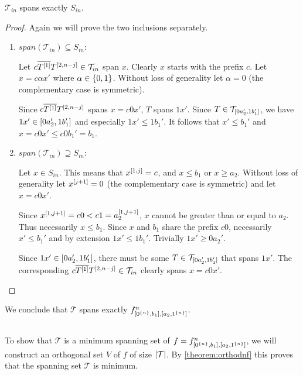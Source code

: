 \begin{lemma}
$\mathcal{T}_{in}$ spans exactly $S_{in}$.
\end{lemma}

\begin{proof}
Again
we will prove the two inclusions separately.
\begin{enumerate}
\item $span(\mathcal{T}_{in}) \subseteq S_{in}$:

Let $c \overline{T^{[1]}} T^{[2, n-j]} \in \mathcal{T}_{in}$ span $x$.
Clearly $x$ starts with the prefix $c$.
Let $x = c \alpha x'$ where $\alpha \in \{0, 1\}$.
Without loss of generality let $\alpha = 0$
(the complementary case is symmetric).

Since $c \overline{T^{[1]}} T^{[2, n-j]}$ spans
$x = c 0 x'$,
$T$ spans $1 x'$.
Since
$T \in \mathcal{T}_{[0 a_2', 1 b_1']}$,
we have $1 x' \in [0 a_2', 1 b_1']$
and especially $1 x' \leq 1 b_1'$.
It follows that $x' \leq b_1'$
and $x = c 0 x' \leq c 0 b_1' = b_1$.

\item $span(\mathcal{T}_{in}) \supseteq S_{in}$:

Let $x \in S_{in}$.
This means that $x^{[1, j]} = c$,
and $x \leq b_1$ or $x \geq a_2$.
Without loss of generality let $x^{[j+1]} = 0$
(the complementary case is symmetric)
and let $x = c 0 x'$.

Since $x^{[1, j+1]} = c 0 < c 1 = a_2^{[1, j+1]}$,
$x$ cannot be greater than or equal to $a_2$.
Thus necessarily $x \leq b_1$.
Since $x$ and $b_1$ share the prefix $c 0$,
necessarily $x' \leq b_1'$
and by extension $1 x' \leq 1 b_1'$.
Trivially $1 x' \geq 0 a_2'$.

Since $1 x' \in [0 a_2', 1 b_1']$,
there must be some
$T \in \mathcal{T}_{[0 a_2', 1 b_1']}$
that spans $1 x'$.
The corresponding
$c \overline{T^{[1]}} T^{[2, n-j]}
\in \mathcal{T}_{in}$ clearly spans $x = c 0 x'$.
\end{enumerate}
\end{proof}

We conclude that $\mathcal{T}$ spans exactly $f^{n}_{[0^{\{n\}}, b_1], [a_2, 1^{\{n\}}]}$.

\subsection{\titleoptimality}

To show that $\mathcal{T}$
is a minimum spanning set of $f = f^{n}_{[0^{\{n\}}, b_1], [a_2, 1^{\{n\}}]}$,
we will construct an orthogonal set $V$ of $f$
of size $\lvert\mathcal{T}\rvert$.
By \cref{theorem:orthodnf} this proves
that the spanning set $\mathcal{T}$ is minimum.

